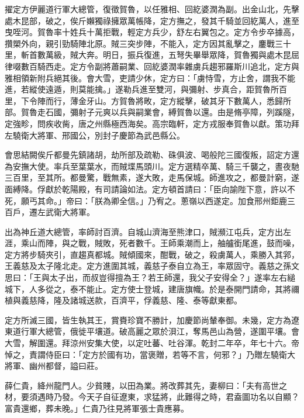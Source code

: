 \begin{pinyinscope}
 擢定方伊麗道行軍大總管，復徵賀魯，以任雅相、回紇婆潤為副。出金山北，先擊處木昆部，破之，俟斤嬾獨祿擁眾萬帳降，定方撫之，發其千騎並回紇萬人，進至曳咥河。賀魯率十姓兵十萬拒戰，輕定方兵少，舒左右翼包之。定方令步卒據高，攢槊外向，親引勁騎陣北原。賊三突步陣，不能入，定方因其亂擊之，鏖戰三十里，斬首數萬級，賊大奔。明日，振兵復進，五弩失畢舉眾降，賀魯獨與處木昆屈律啜數百騎西走。定方令副將蕭嗣業、回紇婆潤率雜虜兵趨邪羅斯川追北，定方與雅相領新附兵絕其後。會大雪，吏請少休，定方曰：「虜恃雪，方止舍，謂我不能進，若縱使遠遁，則莫能擒。」遂勒兵進至雙河，與彌射、步真合，距賀魯所百里，下令陣而行，薄金牙山。方賀魯將畋，定方縱擊，破其牙下數萬人，悉歸所部。賀魯走石國，彌射子元爽以兵與嗣業會，縛賀魯以還。由是脩亭障，列蹊隧，定強畛，問疾收胔，唐之州縣極西海矣。高宗臨軒，定方戎服奉賀魯以獻。策功拜左驍衛大將軍、邢國公，別封子慶節為武邑縣公。



 會思結闕俟斤都曼先鎮諸胡，劫所部及疏勒、硃俱波、喝般陀三國復叛，詔定方還為安撫大使。率兵至葉葉水，而賊堞馬頭川。定方選精卒萬、騎三千襲之，晝夜馳三百里，至其所。都曼驚，戰無素，遂大敗，走馬保城。師進攻之，都曼計窮，遂面縛降。俘獻於乾陽殿，有司請論如法。定方頓首請曰：「臣向諭陛下意，許以不死，願丐其命。」帝曰：「朕為卿全信。」乃宥之。蔥嶺以西遂定。加食邢州鉅鹿三百戶，遷左武衛大將軍。



 出為神丘道大總管，率師討百濟。自城山濟海至熊津口，賊瀕江屯兵，定方出左涯，乘山而陣，與之戰，賊敗，死者數千。王師乘潮而上，舳艫銜尾進，鼓而噪，定方將步騎夾引，直趨真都城。賊傾國來，酣戰，破之，殺虜萬人，乘勝入其郛，王義慈及太子隆北走。定方進圍其城，義慈子泰自立為王，率眾固守。義慈之孫文思曰：「王與太子出，而叔豈得擅為王？若王師還，我父子安得全？」遂率左右縋城下，人多從之，泰不能止。定方使士登城，建唐旗幟。於是泰開門請命，其將禰植與義慈降，隆及諸城送款，百濟平，俘義慈、隆、泰等獻東都。



 定方所滅三國，皆生執其王，賞賚珍寶不勝計，加慶節尚輦奉御。未幾，定方為遼東道行軍大總管，俄徙平壤道。破高麗之眾於浿江，奪馬邑山為營，遂圍平壤。會大雪，解圍還。拜涼州安集大使，以定吐蕃、吐谷渾。乾封二年卒，年七十六。帝悼之，責謂侍臣曰：「定方於國有功，當褒贈，若等不言，何邪？」乃贈左驍衛大將軍、幽州都督，謚曰莊。



 薛仁貴，絳州龍門人。少貧賤，以田為業。將改葬其先，妻柳曰：「夫有高世之材，要須遇時乃發。今天子自征遼東，求猛將，此難得之時，君盍圖功名以自顯？富貴還鄉，葬未晚。」仁貴乃往見將軍張士貴應募。




\end{pinyinscope}
